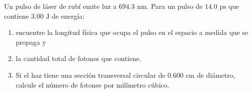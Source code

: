 \item Un pulso de láser de rubí emite luz a $694.3\text{ nm}$. Para un pulso de $14.0\text{ ps}$ que contiene $3.00\text{ J}$ de energía:
\begin{enumerate}
    \item encuentre la longitud física que ocupa el pulso en el espacio a medida que se propaga y
    \item la cantidad total de fotones que contiene.
    \item Si el haz tiene una sección transversal circular de $0.600\text{ cm}$ de diámetro, calcule el número de fotones por milímetro cúbico.
\end{enumerate}